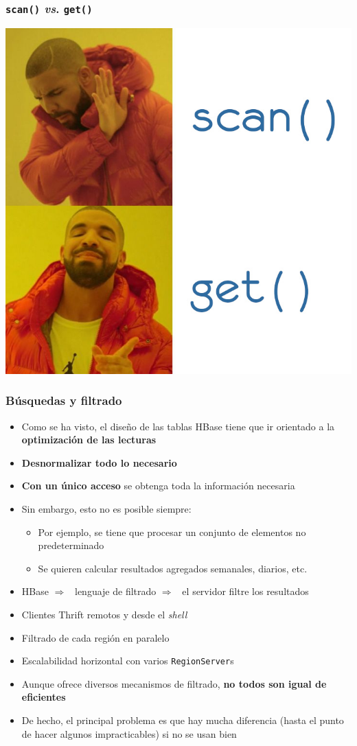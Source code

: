 \documentclass[14pt]{beamer}
\newcommand{\ra}{{\color{blue} $\Rightarrow${}~{}}}
\begin{document}
\begin{frame}
  \frametitle{{\tt scan()} {\em vs}. {\tt get()}}
\centering\includegraphics[height=.8\paperheight]{img/drake}
\end{frame}

\begin{frame}[allowframebreaks]
  \frametitle{Búsquedas y filtrado}
\begin{itemize}
\item Como se ha visto, el diseño de las tablas HBase tiene que ir
  orientado a la {\bf optimización de las lecturas}
\item {\bf Desnormalizar todo lo necesario}
\item {\bf Con un único acceso} se obtenga toda la información necesaria
\item Sin embargo, esto no es posible siempre:
  \begin{itemize}
  \item Por ejemplo, se tiene que procesar un conjunto de elementos no
    predeterminado
  \item Se quieren calcular resultados agregados semanales, diarios, etc.
  \end{itemize}

\framebreak

\item HBase \ra{} lenguaje de filtrado \ra{} el servidor filtre los
  resultados
\item Clientes Thrift remotos y desde el {\em shell}
\item Filtrado de cada región en paralelo
\item Escalabilidad horizontal con varios {\tt RegionServer}s
\item Aunque ofrece diversos mecanismos de filtrado, {\bf no todos son
    igual de eficientes}
\item De hecho, el principal problema es que hay mucha diferencia (hasta el
  punto de hacer algunos impracticables) si no se usan bien
\end{itemize}
\end{frame}
\end{document}
